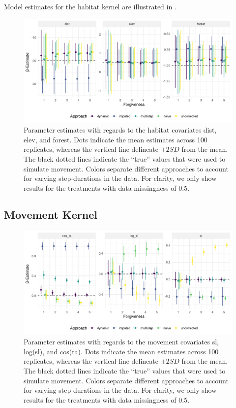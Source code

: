 \documentclass[abstract=on,10pt,a4paper,bibliography=totocnumbered]{article}
\begin{document}
Model estimates for the habitat kernel are illustrated in .
\begin{figure}
  \begin{center}
  \includegraphics[width = \textwidth]{99_ResultsHabitatKernel.png}
  \caption{Parameter estimates with regards to the habitat covariates
  \textsf{dist}, \textsf{elev}, and \textsf{forest}. Dots indicate the mean
  estimates across 100 replicates, whereas the vertical line delineate $\pm 2SD$
  from the mean. The black dotted lines indicate the ``true'' values that were
  used to simulate movement. Colors separate different approaches to account for
  varying step-durations in the data. For clarity, we only show results for the
  treatments with data missingness of 0.5.}
  \label{ResultsHabitat}
  \end{center}
\end{figure}

\subsection{Movement Kernel}

\begin{figure}
  \begin{center}
  \includegraphics[width = \textwidth]{99_ResultsMovementKernel.png}
  \caption{Parameter estimates with regards to the movement covariates
  \textsf{sl}, \textsf{log(sl)}, and \textsf{cos(ta)}. Dots indicate the mean
  estimates across 100 replicates, whereas the vertical line delineate $\pm 2SD$
  from the mean. The black dotted lines indicate the ``true'' values that were
  used to simulate movement. Colors separate different approaches to account for
  varying step-durations in the data. For clarity, we only show results for the
  treatments with data missingness of 0.5.}
  \label{ResultsMovement}
  \end{center}
\end{figure}
\end{document}
